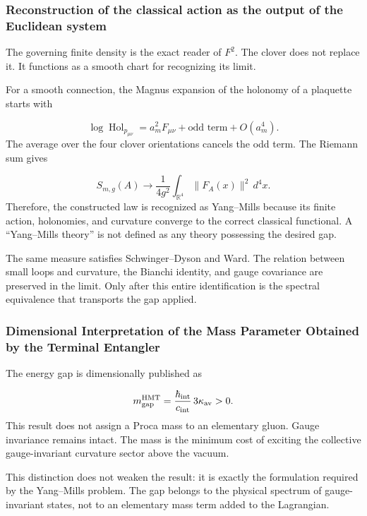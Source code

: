 \subsubsection{Reconstruction of the classical action as the output of the Euclidean system}
The governing finite density is the exact reader of \(F^2\). The clover does not replace it. It functions as a smooth chart for recognizing its limit.\par
For a smooth connection, the Magnus expansion of the holonomy of a plaquette starts with\par
\[
\log\operatorname{Hol}_{p_{\mu\nu}}
=
a_m^2F_{\mu\nu}
+\text{odd term}
+O(a_m^4).
\]
The average over the four clover orientations cancels the odd term. The Riemann sum gives\par
\[
S_{m,g}(A)
\longrightarrow
\frac1{4g^2}
\int_{\mathbb R^4}\|F_A(x)\|^2\,d^4x.
\]
Therefore, the constructed law is recognized as Yang–Mills because its finite action, holonomies, and curvature converge to the correct classical functional. A “Yang–Mills theory” is not defined as any theory possessing the desired gap.\par
The same measure satisfies Schwinger–Dyson and Ward. The relation between small loops and curvature, the Bianchi identity, and gauge covariance are preserved in the limit. Only after this entire identification is the spectral equivalence that transports the gap applied.\par
{}
\subsubsection{Dimensional Interpretation of the Mass Parameter Obtained by the Terminal Entangler}
The energy gap is dimensionally published as\par
\[
m_{\rm gap}^{\rm HMT}
=
\frac{\hbar_{\rm int}}{c_{\rm int}}
\,3\kappa_{\rm av}>0.
\]
This result does not assign a Proca mass to an elementary gluon. Gauge invariance remains intact. The mass is the minimum cost of exciting the collective gauge-invariant curvature sector above the vacuum.\par
This distinction does not weaken the result: it is exactly the formulation required by the Yang–Mills problem. The gap belongs to the physical spectrum of gauge-invariant states, not to an elementary mass term added to the Lagrangian.\par
{}
